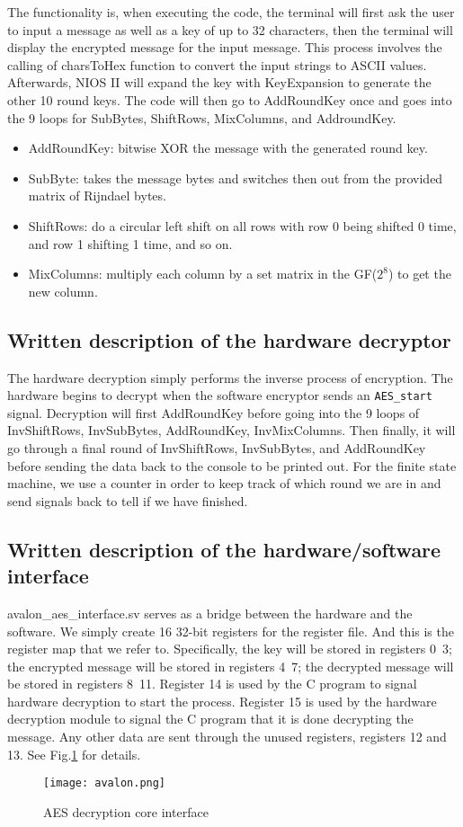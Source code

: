\documentclass[11pt]{article}
\begin{document}
The functionality is, when executing the code, the terminal will first ask the user to input a message as well as a key of up to 32 characters, then the terminal will display the encrypted message for the input message. This process involves the calling of charsToHex function to convert the input strings to ASCII values. Afterwards, NIOS II will expand the key with KeyExpansion to generate the other 10 round keys. The code will then go to AddRoundKey once and goes into the 9 loops for SubBytes, ShiftRows, MixColumns, and AddroundKey.
\begin{itemize}
    \item AddRoundKey: bitwise XOR the message with the generated round key.
    \item SubByte: takes the message bytes and switches then out from the provided matrix of Rijndael bytes.
    \item ShiftRows: do a circular left shift on all rows with row 0 being shifted 0 time, and row 1 shifting 1 time, and so on.
    \item MixColumns: multiply each column by a set matrix in the GF($2^8$) to get the new column.
\end{itemize}

\subsection{Written description of the hardware decryptor}
The hardware decryption simply performs the inverse process of encryption. The hardware begins to decrypt when the software encryptor sends an \verb|AES_start| signal. Decryption will first AddRoundKey before going into the 9 loops of InvShiftRows, InvSubBytes, AddRoundKey, InvMixColumns. Then finally, it will go through a final round of InvShiftRows, InvSubBytes, and AddRoundKey before sending the data back to the console to be printed out. For the finite state machine, we use a counter in order to keep track of which round we are in and send signals back to tell if we have finished.

\subsection{Written description of the hardware/software interface}
avalon\_aes\_interface.sv serves as a bridge between the hardware and the software. We simply create 16 32-bit registers for the register file. And this is the register map that we refer to. Specifically, the key will be stored in registers 0~3; the encrypted message will be stored in registers 4~7; the decrypted message will be stored in registers 8~11. Register 14 is used by the C program to signal hardware decryption to start the process. Register 15 is used by the hardware decryption module to signal the C program that it is done decrypting the message. Any other data are sent through the unused registers, registers 12 and 13. See Fig.\ref{avalon} for details.
\begin{figure}[ht]
    \centering
    \texttt{[image: avalon.png]}
    \caption{AES decryption core interface}
    \label{avalon}
\end{figure}
\end{document}
